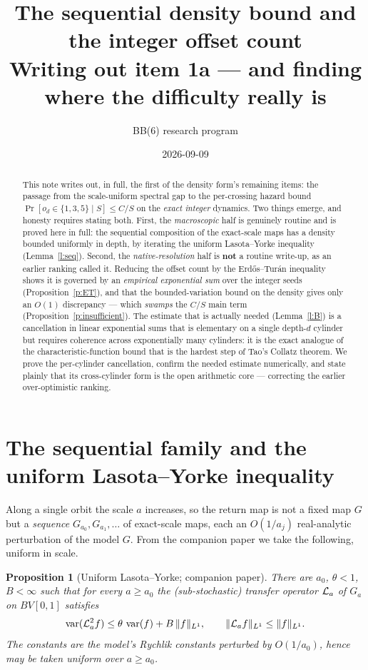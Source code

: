 \documentclass[11pt]{article}
\title{\bfseries The sequential density bound and the integer offset count\\[3pt]
\large Writing out item 1a --- and finding where the difficulty really is}
\author{BB(6) research program}\date{2026-09-09}
\newtheorem{proposition}{Proposition}\newtheorem{corollary}{Corollary}
\theoremstyle{remark}\newtheorem{remark}{Remark}
\begin{document}
\maketitle

\begin{abstract}
This note writes out, in full, the first of the density form's remaining items:
the passage from the scale-uniform spectral gap to the per-crossing hazard bound
$\Pr[o_d\in\{1,3,5\}\mid S]\le C/S$ on the \emph{exact integer} dynamics. Two
things emerge, and honesty requires stating both. First, the
\emph{macroscopic} half is genuinely routine and is proved here in full: the
sequential composition of the exact-scale maps has a density bounded uniformly
in depth, by iterating the uniform Lasota--Yorke inequality (Lemma~\ref{l:seq}).
Second, the \emph{native-resolution} half is \textbf{not} a routine write-up, as
an earlier ranking called it. Reducing the offset count by the Erd\H os--Tur\'an
inequality shows it is governed by an \emph{empirical exponential sum} over the
integer seeds (Proposition~\ref{p:ET}), and that the bounded-variation bound on
the density gives only an $O(1)$ discrepancy --- which \emph{swamps} the $C/S$
main term (Proposition~\ref{p:insufficient}). The estimate that is actually
needed (Lemma~\ref{l:B}) is a cancellation in linear exponential sums that is
elementary on a single depth-$d$ cylinder but requires coherence across
exponentially many cylinders: it is the exact analogue of the
characteristic-function bound that is the hardest step of Tao's Collatz theorem.
We prove the per-cylinder cancellation, confirm the needed estimate numerically,
and state plainly that its cross-cylinder form is the open arithmetic core ---
correcting the earlier over-optimistic ranking.
\end{abstract}

\section{The sequential family and the uniform Lasota--Yorke inequality}
Along a single orbit the scale $a$ increases, so the return map is not a fixed
map $G$ but a \emph{sequence} $G_{a_0},G_{a_1},\dots$ of exact-scale maps, each
an $O(1/a_j)$ real-analytic perturbation of the model $G$. From the companion
paper we take the following, uniform in scale.

\begin{proposition}[Uniform Lasota--Yorke; companion paper]\label{p:LY}
There are $a_0$, $\theta<1$, $B<\infty$ such that for every $a\ge a_0$ the
(sub-stochastic) transfer operator $\mathcal L_a$ of $G_a$ on $BV[0,1]$ satisfies
\[
\operatorname{var}(\mathcal L_a^2 f)\le\theta\,\operatorname{var}(f)+B\,\|f\|_{L^1},\qquad \|\mathcal L_a f\|_{L^1}\le\|f\|_{L^1}.
\]
The constants are the model's Rychlik constants perturbed by $O(1/a_0)$, hence
may be taken uniform over $a\ge a_0$.
\end{proposition}
\end{document}
